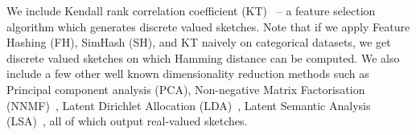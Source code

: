  
 We include Kendall rank correlation coefficient (KT)~\cite{kendall1938measure} -- a feature selection algorithm which generates discrete valued sketches. Note that if we apply Feature Hashing (FH), SimHash (SH), and KT naively on  categorical datasets, we get discrete valued sketches on which Hamming distance can be computed.%
We also include a few other well known dimensionality reduction methods such as Principal component analysis (PCA), Non-negative Matrix Factorisation (NNMF)~\cite{NNMF}, Latent Dirichlet Allocation (LDA)~\cite{LDA}, Latent Semantic Analysis (LSA)~\cite{LSI},    all of which output real-valued sketches.









